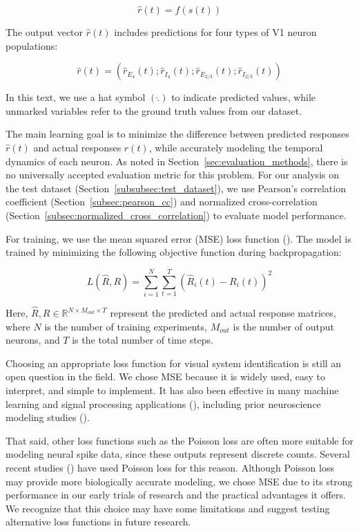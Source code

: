 \begin{equation*}
    \hat{r}(t) = f(s(t))
\end{equation*}

The output vector $\hat{r}(t)$ includes predictions for four types of V1 neuron populations:

\begin{equation*}
    \hat{r}(t) = \left(\hat{r}_{E_4}(t); \hat{r}_{I_4}(t); \hat{r}_{E_{2/3}}(t); \hat{r}_{I_{2/3}}(t)\right)
\end{equation*}

In this text, we use a hat symbol $(\hat{.})$ to indicate predicted values, while unmarked variables refer to the ground truth values from our dataset.

The main learning goal is to minimize the difference between predicted responses $\hat{r}(t)$ and actual responses $r(t)$, while accurately modeling the temporal dynamics of each neuron. As noted in Section~\ref{sec:evaluation_methods}, there is no universally accepted evaluation metric for this problem. For our analysis on the test dataset (Section~\ref{subsubsec:test_dataset}), we use Pearson's correlation coefficient (Section~\ref{subsec:pearson_cc}) and normalized cross-correlation (Section~\ref{subsec:normalized_cross_correlation}) to evaluate model performance.

For training, we use the mean squared error (MSE) loss function (\citet{alpaydin2020introduction}). The model is trained by minimizing the following objective function during backpropagation:

\begin{equation*}
    L(\hat{R}, R) = \sum_{i=1}^{N}\sum_{t=1}^{T}\left(\hat{R}_i(t) - R_i(t)\right)^2
\end{equation*}

Here, $\hat{R}, R \in \mathbb{R}^{N \times M_{out} \times T}$ represent the predicted and actual response matrices, where $N$ is the number of training experiments, $M_{out}$ is the number of output neurons, and $T$ is the total number of time steps.

Choosing an appropriate loss function for visual system identification is still an open question in the field. We chose MSE because it is widely used, easy to interpret, and simple to implement. It has also been effective in many machine learning and signal processing applications (\citet{wang2009mse, soderstrom2018errors}), including prior neuroscience modeling studies (\citet{antolik2016local}).

That said, other loss functions such as the Poisson loss are often more suitable for modeling neural spike data, since these outputs represent discrete counts. Several recent studies (\citet{terven2024lossfunctionsmetricsdeep, Wang2023towards, sinz2018stimulus}) have used Poisson loss for this reason. Although Poisson loss may provide more biologically accurate modeling, we chose MSE due to its strong performance in our early trials of research and the practical advantages it offers. We recognize that this choice may have some limitations and suggest testing alternative loss functions in future research.


